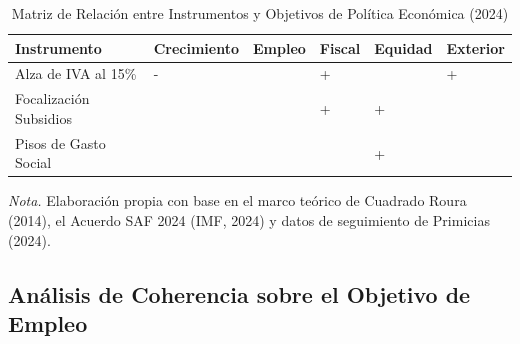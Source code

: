 \documentclass[12pt,spanish]{article}
\newcommand{\fuente}[1]{
  \vspace{4pt}
  \begin{flushleft}
    \small
    \textit{Nota.} #1
  \end{flushleft}
}
\begin{document}
{

\begin{longtable}[]{@{}
  >{\raggedright\arraybackslash}p{}
  >{\centering\arraybackslash}p{}
  >{\centering\arraybackslash}p{}
  >{\centering\arraybackslash}p{}
  >{\centering\arraybackslash}p{}
  >{\centering\arraybackslash}p{}@{}}

\caption{\label{tbl-matriz}Matriz de Relación entre Instrumentos y
Objetivos de Política Económica (2024)}

\tabularnewline

\toprule\noalign{}
\begin{minipage}[b]{\linewidth}\raggedright
Instrumento
\end{minipage} & \begin{minipage}[b]{\linewidth}\centering
Crecimiento
\end{minipage} & \begin{minipage}[b]{\linewidth}\centering
Empleo
\end{minipage} & \begin{minipage}[b]{\linewidth}\centering
Fiscal
\end{minipage} & \begin{minipage}[b]{\linewidth}\centering
Equidad
\end{minipage} & \begin{minipage}[b]{\linewidth}\centering
Exterior
\end{minipage} \\
\midrule\noalign{}
\endhead
\bottomrule\noalign{}
\endlastfoot
Alza de IVA al 15\% & - & & + & & + \\
Focalización Subsidios & & & + & + & \\
Pisos de Gasto Social & & & & + & \\

\end{longtable}

}

\fuente{Elaboración propia con base en el marco teórico de Cuadrado Roura (2014), el Acuerdo SAF 2024 (IMF, 2024) y datos de seguimiento de Primicias (2024).}

\subsection{Análisis de Coherencia sobre el Objetivo de
Empleo}\label{anuxe1lisis-de-coherencia-sobre-el-objetivo-de-empleo}
\end{document}
